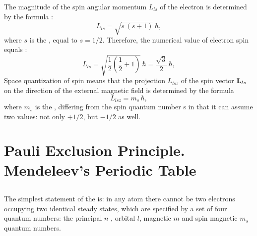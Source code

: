 The magnitude of the spin angular momentum $L_{ls}$ of the electron is determined by the formula :
\begin{equation*}%
L_{ls}= \sqrt{s\, (s+1)}\, \hbar,
\end{equation*}
where $s$ is the , equal to $s = 1/2$. Therefore, the numerical value of electron spin equals :
\begin{equation*}%
L_{ls}= \sqrt{\frac{1}{2} \left( \frac{1}{2} + 1 \right)} \, \hbar = \frac{\sqrt{3}}{2} \,\hbar,
\end{equation*}
Space quantization of spin means that the projection $L_{lsz}$
of the spin vector $\vb{L}_{ls}$ on the direction of the external magnetic field is determined by the formula
\begin{equation*}%
L_{lsz}= m_{s} \, \hbar,
\end{equation*}
where $m_{s}$ is the , differing from the spin quantum number s in that it can assume two values: not only $+1/2$, but $-1/2$ as well.

\section[Pauli Exclusion Principle. Periodic Table]{Pauli Exclusion Principle. Mendeleev's Periodic Table}
\label{sec-39.3} 




\subsection{}\label{39.3.1} The simplest statement of the is: in any atom there cannot be two electrons occupying two identical steady states, which are specified by a set of four quantum numbers: the principal $n$ , orbital $l$, magnetic $m$ and spin magnetic $m_{s}$ quantum numbers.

